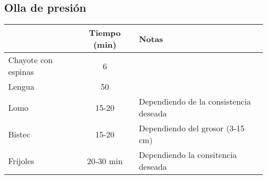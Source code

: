 \subsection{Olla de presi\'on}

\begin{table}[H]
  \begin{tabular}{l | c | l}
    & Tiempo (min) & Notas \\
    \hline
     Chayote con espinas     & 6 &  \\
    Lengua     & 50 &  \\
    Lomo    & 15-20  & Dependiendo de la consistencia deseada \\
    Bistec        & 15-20  & Dependiendo del grosor (3-15 cm) \\
    Frijoles  & 20-30 min & Dependiendo la consitencia deseada 
  \end{tabular}
  \end{table}
